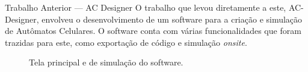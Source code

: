 \begin{frame}{Trabalho Anterior — AC Designer}
    O trabalho que levou diretamente a este, AC-Designer, envolveu o desenvolvimento de um software para a criação e simulação de Autômatos Celulares. O software conta com várias funcionalidades que foram trazidas para este, como exportação de código e simulação \textit{onsite}.

    \begin{figure}
        \centering
    
        \quad
    
        \caption{Tela principal e de simulação do software.}
    \end{figure}
\end{frame}

